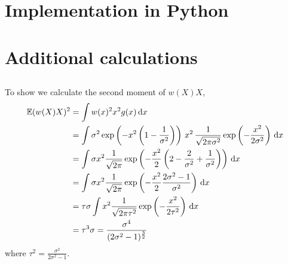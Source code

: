 \chapter{Implementation in Python}

\chapter{Additional calculations}

\section*{}
To show  we calculate the second moment of $w(X)X$,
\begin{align*}
    \mathbb E (w(X)X)^{2} &= \int w(x)^{2} x^{2} g(x) \,\mathrm d x \\
    &= \int \sigma^{2} \exp \left( - x^{2} \left( 1 - \frac{1}{\sigma^{2}} \right)\right)\, x^{2}\, \frac{1}{\sqrt{2\pi\sigma^{2}}} \exp \left( -\frac{x^{2}}{2\sigma^{2}} \right)  \,\mathrm d x \\
    &= \int \sigma x^{2} \frac{1}{\sqrt{2\pi}}\exp \left( - \frac{x^{2}}{2} \left( 2 - \frac{2}{\sigma^{2}} + \frac{1}{\sigma^{2}} \right) \right)\,\mathrm d x \\
    &= \int \sigma x^{2} \frac{1}{\sqrt{2\pi}}\exp \left( - \frac{x^{2}}{2} \frac{2\sigma^{2} - 1}{\sigma^{2}} \right)\,\mathrm d x \\
    &= \tau \sigma \int x^{2} \frac{1}{\sqrt{2\pi\tau^{2}}} \exp \left( - \frac{x^{2}}{2\tau^{2}}\right)\,\mathrm d x \\
    &= \tau^{3} \sigma = \frac{\sigma^{4}}{(2\sigma^{2} - 1)^{\frac{3}{2}}}
\end{align*}
where $\tau^{2} = \frac{\sigma^{2}}{2\sigma^{2} - 1}$.
